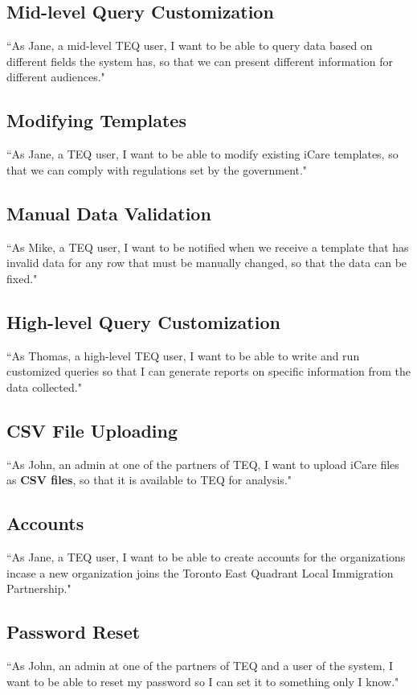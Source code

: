 \documentclass[12pt]{article}
\begin{document}
\subsection{Mid-level Query Customization}
``As Jane, a mid-level TEQ user, I want to be able to query data based on different fields the system has, so that we can present different information for different audiences."

\subsection{Modifying Templates}
``As Jane, a TEQ user,  I want to be able to modify existing iCare templates, so that we can comply with regulations set by the government."

\subsection{Manual Data Validation}
``As Mike, a TEQ user, I want to be notified when we receive a template that has invalid data for any row that must be manually changed, so that the data can be fixed."

\subsection{High-level Query Customization}
``As Thomas, a high-level TEQ user, I want to be able to write and run customized queries so that I can generate reports on specific information from the data collected."

\subsection{CSV File Uploading}
``As John, an admin at one of the partners of TEQ, I want to upload iCare files as \textbf{CSV files}, so that it is available to TEQ for analysis."

\subsection{Accounts} ``As Jane, a TEQ user, I want to be able to create accounts for the organizations incase a new organization joins the Toronto East Quadrant Local Immigration Partnership."

\subsection{Password Reset}
``As John, an admin at one of the partners of TEQ and a user of the system, I want to be able to reset my password so I can set it to something only I know."
\end{document}
